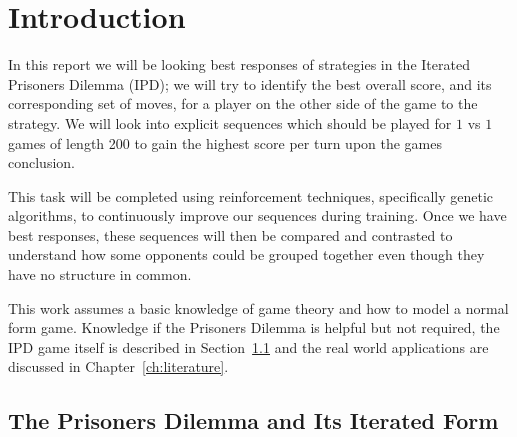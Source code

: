 
\chapter{Introduction}\label{ch:intro}
In this report we will be looking best responses of strategies in the Iterated Prisoners Dilemma (IPD);
we will try to identify the best overall score, and its corresponding set of moves, for a player on the other side of the game to the strategy.
We will look into explicit sequences which should be played for $1$ vs $1$ games of length 200 to gain the highest score per turn upon the games conclusion.

This task will be completed using reinforcement techniques, specifically genetic algorithms, to continuously improve our sequences during training. Once we have best responses, these sequences will then be compared and contrasted to understand how some opponents could be grouped together even though they have no structure in common.

This work assumes a basic knowledge of game theory and how to model a normal form game.
Knowledge if the Prisoners Dilemma is helpful but not required, the IPD game itself is described in Section~\ref{sec:iteratedPrisonersDilemma} and the real world applications are discussed in Chapter~\ref{ch:literature}.

\section{The Prisoners Dilemma and Its Iterated Form}\label{sec:iteratedPrisonersDilemma}

